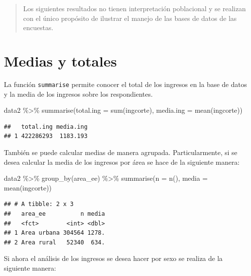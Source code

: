 \documentclass[
  12pt,
]{book}
\newenvironment{Shaded}{\begin{snugshade}}{\end{snugshade}}
\newcommand{\AttributeTok}[1]{\textcolor[rgb]{0.77,0.63,0.00}{#1}}
\newcommand{\FunctionTok}[1]{\textcolor[rgb]{0.00,0.00,0.00}{#1}}
\newcommand{\NormalTok}[1]{#1}
\newcommand{\SpecialCharTok}[1]{\textcolor[rgb]{0.00,0.00,0.00}{#1}}
\begin{document}
\begin{quote}
Los siguientes resultados no tienen interpretación poblacional y se realizan con el único propósito de ilustrar el manejo de las bases de datos de las encuestas.
\end{quote}

\hypertarget{medias-y-totales}{%
\section{Medias y totales}\label{medias-y-totales}}

La función \texttt{summarise} permite conocer el total de los ingresos en la base de datos y la media de los ingresos sobre los respondientes.

\begin{Shaded}
\begin{Highlighting}[]
\NormalTok{data2 }\SpecialCharTok{\%\textgreater{}\%} \FunctionTok{summarise}\NormalTok{(}\AttributeTok{total.ing =} \FunctionTok{sum}\NormalTok{(ingcorte),}
                    \AttributeTok{media.ing =} \FunctionTok{mean}\NormalTok{(ingcorte))}
\end{Highlighting}
\end{Shaded}

\begin{verbatim}
##   total.ing media.ing
## 1 422286293  1183.193
\end{verbatim}

También se puede calcular medias de manera agrupada. Particularmente, si se desea calcular la media de los ingresos por área se hace de la siguiente manera:

\begin{Shaded}
\begin{Highlighting}[]
\NormalTok{data2 }\SpecialCharTok{\%\textgreater{}\%} \FunctionTok{group\_by}\NormalTok{(area\_ee) }\SpecialCharTok{\%\textgreater{}\%}
  \FunctionTok{summarise}\NormalTok{(}\AttributeTok{n =} \FunctionTok{n}\NormalTok{(),}
            \AttributeTok{media =} \FunctionTok{mean}\NormalTok{(ingcorte))}
\end{Highlighting}
\end{Shaded}

\begin{verbatim}
## # A tibble: 2 x 3
##   area_ee          n media
##   <fct>        <int> <dbl>
## 1 Area urbana 304564 1278.
## 2 Area rural   52340  634.
\end{verbatim}

Si ahora el análisis de los ingresos se desea hacer por sexo se realiza de la siguiente manera:
\end{document}
